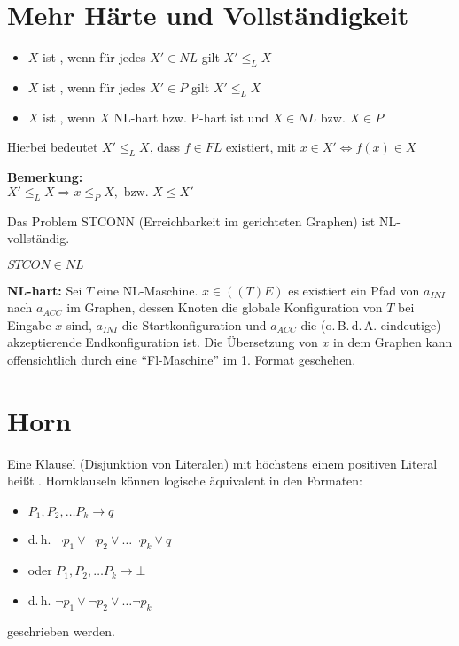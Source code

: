\section{Mehr Härte und Vollständigkeit}

\begin{itemize}
\item $X$ ist , wenn für jedes $X'\in NL$ gilt $X' \leq_L X$
\item $X$ ist , wenn für jedes $X'\in P$ gilt $X' \leq_L X$
\item $X$ ist , wenn $X$ NL-hart bzw. P-hart ist und $X\in NL$ bzw. $X\in P$
\end{itemize}

Hierbei bedeutet $X' \leq_L X$, dass $f \in FL$ existiert, mit $x \in X' \Leftrightarrow f(x) \in X$

\textbf{Bemerkung:}\\
$X' \leq_L X \Rightarrow x \leq_P X, \text{ bzw. } X \leq X'$

\begin{satz}
    Das Problem STCONN (Erreichbarkeit im gerichteten Graphen) ist NL-vollständig.
\end{satz}

\begin{beweis}
    $STCON \in NL$ \checkmark

    \textbf{NL-hart:} Sei $T$ eine NL-Maschine. $x \in ((T) E)$
    es existiert ein Pfad von $a_{INI}$ nach $a_{ACC}$ im Graphen, dessen
    Knoten die globale Konfiguration von $T$ bei Eingabe $x$ sind, $a_{INI}$ die
    Startkonfiguration und $a_{ACC}$ die (o.\,B.\,d.\,A. eindeutige) akzeptierende Endkonfiguration ist. Die Übersetzung von $x$ in dem Graphen kann offensichtlich durch eine ``Fl-Maschine'' im 1. Format geschehen.
\end{beweis}





\section{Horn}


\begin{definition}
    Eine Klausel (Disjunktion von Literalen) mit höchstens einem positiven
    Literal heißt . Hornklauseln können logische äquivalent in
    den Formaten:
    \begin{itemize}
    \item $P_1, P_2, \dots P_k \rightarrow q$ 
    \item d.\,h. $\neg p_1 \lor \neg p_2 \lor \dots \neg p_k \lor q$
    \item oder $P_1, P_2, \dots P_k \rightarrow \bot$
    \item d.\,h. $\neg p_1 \lor \neg p_2 \lor \dots \neg p_k$
    \end{itemize}
    geschrieben werden.

\end{definition}



